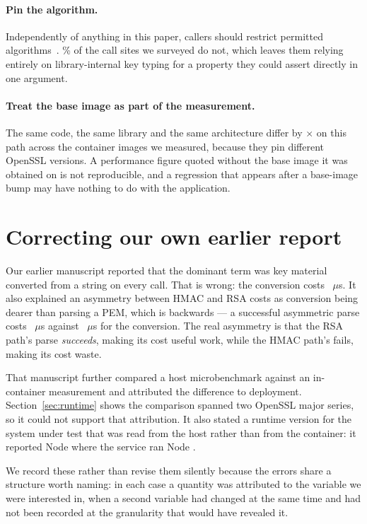 \documentclass[pdflatex,sn-basic,twocolumn]{sn-jnl}
\begin{document}
\paragraph{Pin the algorithm.} Independently of anything in this paper, callers
should restrict permitted algorithms~\cite{rfc8725}.
\SampleNoAlgorithmsPct\% of the call sites we surveyed do not, which leaves them
relying entirely on library-internal key typing for a property they could assert
directly in one argument.

\paragraph{Treat the base image as part of the measurement.} The same code, the
same library and the same architecture differ by \SpanProbeThrows$\times$ on this
path across the container images we measured, because they pin different OpenSSL
versions. A performance figure quoted without the base image it was obtained on
is not reproducible, and a regression that appears after a base-image bump may
have nothing to do with the application.

\section{Correcting our own earlier report}\label{sec:correction}

Our earlier manuscript reported that the dominant term was key material converted
from a string on every call. That is wrong: the conversion costs
\HostCreateSecretKey~$\mu$s. It also explained an asymmetry between HMAC and RSA
costs as conversion being dearer than parsing a PEM, which is backwards --- a
successful asymmetric parse costs \HostProbeSucceeds~$\mu$s against
\HostCreateSecretKey~$\mu$s for the conversion. The real asymmetry is that the
RSA path's parse \emph{succeeds}, making its cost useful work, while the HMAC
path's fails, making its cost waste.

That manuscript further compared a host microbenchmark against an in-container
measurement and attributed the difference to deployment. Section~\ref{sec:runtime}
shows the comparison spanned two OpenSSL major series, so it could not support
that attribution. It also stated a runtime version for the system under test that
was read from the host rather than from the container: it reported Node
\HostNodeVersion{} where the service ran Node \NodeEighteenNodeLiteral.

We record these rather than revise them silently because the errors share a
structure worth naming: in each case a quantity was attributed to the variable we
were interested in, when a second variable had changed at the same time and had
not been recorded at the granularity that would have revealed it.
\end{document}
